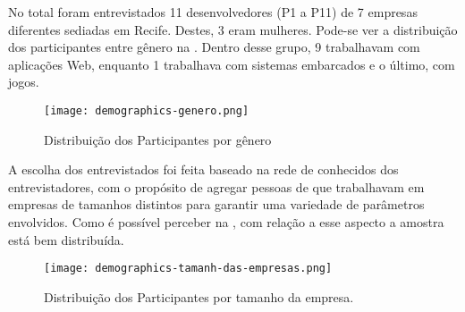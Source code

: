 No total foram entrevistados 11 desenvolvedores (P1 a P11) de 7 empresas diferentes sediadas em Recife. Destes, 3 eram mulheres. Pode-se ver a distribuição dos participantes entre gênero na . Dentro desse grupo, 9 trabalhavam com aplicações Web, enquanto 1 trabalhava com sistemas embarcados e o último, com jogos.

\begin{figure}[ht]
\begin{center}
\texttt{[image: demographics-genero.png]}
\end{center}
\caption[Distribuição dos Participantes por gênero]{
    Distribuição dos Participantes por gênero
}\label{genero}
\end{figure}

A escolha dos entrevistados foi feita baseado na rede de conhecidos dos entrevistadores, com o propósito de agregar pessoas de que trabalhavam em empresas de tamanhos distintos para garantir uma variedade de parâmetros envolvidos. Como é possível perceber na , com relação a esse aspecto a amostra está bem distribuída. 


\begin{figure}[ht]
\begin{center}
\texttt{[image: demographics-tamanh-das-empresas.png]}
\end{center}
\caption[Distribuição dos Participantes por tamanho da empresa]{
    Distribuição dos Participantes por tamanho da empresa.
}\label{tamanho_empresa}
\end{figure}


